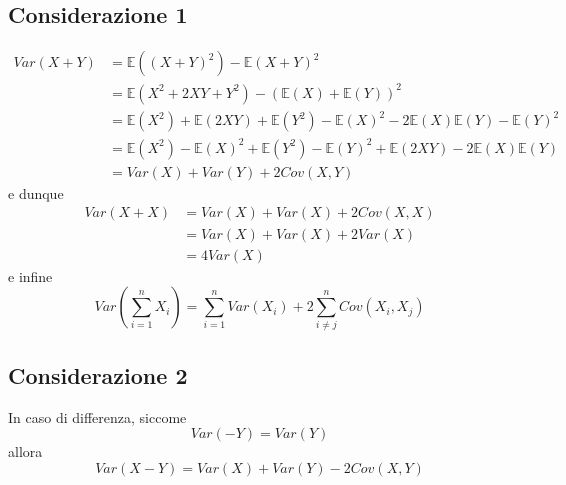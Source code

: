 \documentclass[11pt]{report}
\begin{document}
\subsection{Considerazione 1}
\begin{equation}
	\begin{split}
	Var(X + Y) & = \mathbb{E}((X + Y)^2) - \mathbb{E}(X + Y)^2\\
	& = \mathbb{E}(X^2 + 2XY + Y^2) - (\mathbb{E}(X) + \mathbb{E}(Y))^2\\
	& = \mathbb{E}(X^2) + \mathbb{E}(2XY) + \mathbb{E}(Y^2) - \mathbb{E}(X)^2 - 2\mathbb{E}(X)\mathbb{E}(Y) - \mathbb{E}(Y)^2\\
	& = \mathbb{E}(X^2) - \mathbb{E}(X)^2 + \mathbb{E}(Y^2) - \mathbb{E}(Y)^2 + \mathbb{E}(2XY) - 2\mathbb{E}(X)\mathbb{E}(Y)\\
	& = Var(X) + Var(Y) + 2Cov(X,Y)
	\end{split}
\end{equation}
e dunque
\begin{equation}
    \begin{split}
        Var(X + X) & = Var(X) + Var(X) + 2Cov(X,X)\\
        & = Var(X) + Var(X) + 2Var(X)\\
        & = 4Var(X)
    \end{split}
\end{equation}
e infine
\begin{equation}
    Var \left( \sum_{i=1}^n X_i \right) = \sum_{i=1}^n Var(X_i) + 2 \sum_{i \neq j}^n Cov(X_i,X_j)
\end{equation}
\subsection{Considerazione 2}
In caso di differenza, siccome
\begin{equation}
	Var(-Y) = Var(Y)
\end{equation}
allora
\begin{equation}
	Var(X - Y) = Var(X) + Var(Y) - 2Cov(X,Y)
\end{equation}
\end{document}
